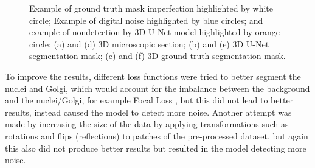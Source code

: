 \begin{figure}[!htb]
\hfil   
{}\hfil
{}
\caption{Example of ground truth mask imperfection highlighted by white circle; Example of digital noise highlighted by blue circles; and example of nondetection by \ac{3D} U-Net model highlighted by orange circle; (a) and (d) \ac{3D} microscopic section; (b) and (e) \ac{3D} U-Net segmentation mask; (c) and (f) \ac{3D} ground truth segmentation mask.}
\label{fig:errors-unet}



\end{figure}

To improve the results, different loss functions were tried to better segment the nuclei and Golgi, which would account for the imbalance between the background and the nuclei/Golgi, for example Focal Loss \cite{focal_loss}, but this did not lead to better results, instead caused the model to detect more noise. Another attempt was made by increasing the size of the data by applying transformations such as rotations and flips (reflections) to patches of the pre-processed dataset, but again this also did not produce better results but resulted in the model detecting more noise.

